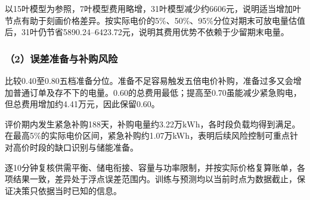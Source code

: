 以15叶模型为参照，7叶模型费用略增，31叶模型减少约6606元，说明适当增加叶节点有助于刻画价格差异。按实际电价的5\%、50\%、95\%分位对期末可放电量估值后，31叶仍节省5890.24--6423.72元，说明其费用优势不依赖于少留期末电量。

\subsubsection*{（2）误差准备与补购风险}

比较0.40至0.80五档准备分位。准备不足容易触发五倍电价补购，准备过多又会增加普通订单及存不下的电量。0.60的总费用最低；提高至0.70虽能减少紧急购电，但总费用增加约4.41万元，因此保留0.60。

评价期内发生紧急补购188天，补购电量约3.22万$\mathrm{kWh}$，各时段负载均得到满足。在最高5\%的实际电价区间，紧急补购约1.07万kWh，表明后续风险控制可重点针对高价时段的缺口识别与储能准备。

逐10分钟复核供需平衡、储电衔接、容量与功率限制，并按实际价格复算账单，各项结果一致，差异处于浮点误差范围内。训练与预测均以当前时点为数据截止，保证决策只依据当时已知的信息。
